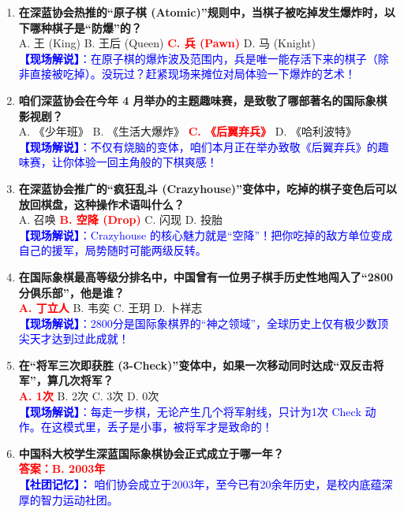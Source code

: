 \documentclass[a4paper, 11pt]{ctexart}
\begin{document}
\begin{enumerate}[label=\arabic*., itemsep=1.5em]
    \item \textbf{在深蓝协会热推的“原子棋 (Atomic)”规则中，当棋子被吃掉发生爆炸时，以下哪种棋子是“防爆”的？} \\
    A. 王 (King) \qquad B. 王后 (Queen) \qquad \textcolor{red}{\textbf{C. 兵 (Pawn)}} \qquad D. 马 (Knight) \\
    \textcolor{blue}{\textbf{【现场解说】}：在原子棋的爆炸波及范围内，兵是唯一能存活下来的棋子（除非直接被吃掉）。没玩过？赶紧现场来摊位对局体验一下爆炸的艺术！}

    \item \textbf{咱们深蓝协会在今年 4 月举办的主题趣味赛，是致敬了哪部著名的国际象棋影视剧？} \\
    A. 《少年班》 \qquad B. 《生活大爆炸》 \qquad \textcolor{red}{\textbf{C. 《后翼弃兵》}} \qquad D. 《哈利波特》 \\
    \textcolor{blue}{\textbf{【现场解说】}：不仅有烧脑的变体，咱们本月正在举办致敬《后翼弃兵》的趣味赛，让你体验一回主角般的下棋爽感！}

    \item \textbf{在深蓝协会推广的“疯狂乱斗 (Crazyhouse)”变体中，吃掉的棋子变色后可以放回棋盘，这种操作术语叫什么？} \\
    A. 召唤 \qquad \textcolor{red}{\textbf{B. 空降 (Drop)}} \qquad C. 闪现 \qquad D. 投胎 \\
    \textcolor{blue}{\textbf{【现场解说】}：Crazyhouse 的核心魅力就是“空降”！把你吃掉的敌方单位变成自己的援军，局势随时可能两级反转。}

    \item \textbf{在国际象棋最高等级分排名中，中国曾有一位男子棋手历史性地闯入了“2800分俱乐部”，他是谁？} \\
    \textcolor{red}{\textbf{A. 丁立人}} \qquad B. 韦奕 \qquad C. 王玥 \qquad D. 卜祥志 \\
    \textcolor{blue}{\textbf{【现场解说】}：2800分是国际象棋界的“神之领域”，全球历史上仅有极少数顶尖天才达到过此成就！}

    \item \textbf{在“将军三次即获胜 (3-Check)”变体中，如果一次移动同时达成“双反击将军”，算几次将军？} \\
    \textcolor{red}{\textbf{A. 1次}} \qquad B. 2次 \qquad C. 3次 \qquad D. 0次 \\
    \textcolor{blue}{\textbf{【现场解说】}：每走一步棋，无论产生几个将军射线，只计为1次 Check 动作。在这模式里，丢子是小事，被将军才是致命的！}


\item \textbf{中国科大校学生深蓝国际象棋协会正式成立于哪一年？} \\
    \textcolor{red}{\textbf{答案：B. 2003年}} \\
    \textcolor{blue}{\textbf{【社团记忆】：} 咱们协会成立于2003年，至今已有20余年历史，是校内底蕴深厚的智力运动社团。}


\end{enumerate}
\end{document}
